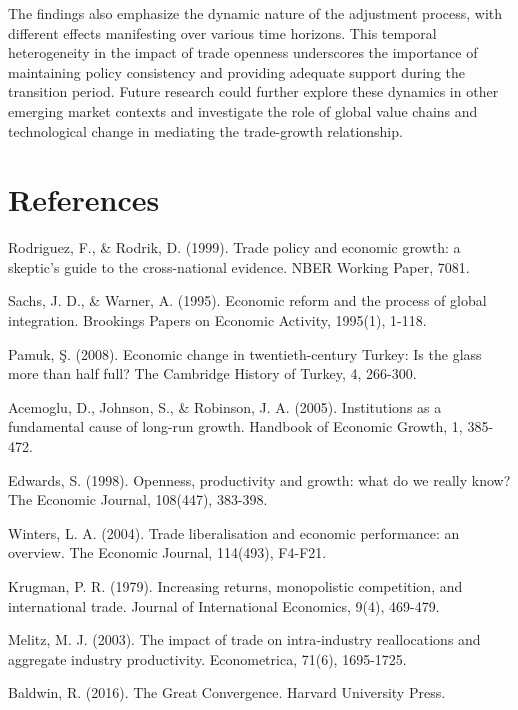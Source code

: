\documentclass[12pt,a4paper]{article}
\theoremstyle{definition}
\begin{document}
The findings also emphasize the dynamic nature of the adjustment process, with different effects manifesting over various time horizons. This temporal heterogeneity in the impact of trade openness underscores the importance of maintaining policy consistency and providing adequate support during the transition period. Future research could further explore these dynamics in other emerging market contexts and investigate the role of global value chains and technological change in mediating the trade-growth relationship.

\section{References}
\begin{thebibliography}{99}
 Rodriguez, F., \& Rodrik, D. (1999). Trade policy and economic growth: a skeptic's guide to the cross-national evidence. NBER Working Paper, 7081.

 Sachs, J. D., \& Warner, A. (1995). Economic reform and the process of global integration. Brookings Papers on Economic Activity, 1995(1), 1-118.

 Pamuk, Ş. (2008). Economic change in twentieth-century Turkey: Is the glass more than half full? The Cambridge History of Turkey, 4, 266-300.

 Acemoglu, D., Johnson, S., \& Robinson, J. A. (2005). Institutions as a fundamental cause of long-run growth. Handbook of Economic Growth, 1, 385-472.

 Edwards, S. (1998). Openness, productivity and growth: what do we really know? The Economic Journal, 108(447), 383-398.

 Winters, L. A. (2004). Trade liberalisation and economic performance: an overview. The Economic Journal, 114(493), F4-F21.

 Krugman, P. R. (1979). Increasing returns, monopolistic competition, and international trade. Journal of International Economics, 9(4), 469-479.

 Melitz, M. J. (2003). The impact of trade on intra‐industry reallocations and aggregate industry productivity. Econometrica, 71(6), 1695-1725.

 Baldwin, R. (2016). The Great Convergence. Harvard University Press.


\end{thebibliography}
\end{document}
